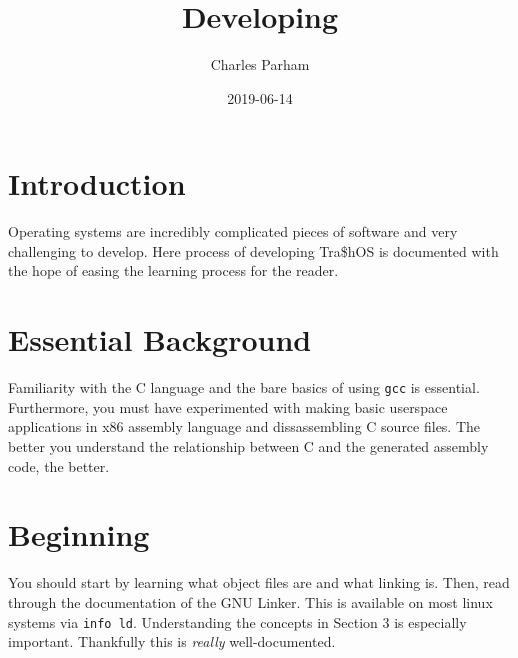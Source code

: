 \documentclass[twocolumn,11pt]{article}
\title{Developing \trashos}
\author{Charles Parham}
\date{2019-06-14}
\newcommand{\trashos}{Tra\$hOS }
\begin{document}
    \maketitle

    \section*{Introduction}

    Operating systems are incredibly complicated pieces of software and very
    challenging to develop. Here process of developing \trashos is documented
    with the hope of easing the learning process for the reader.

    \section{Essential Background}

    Familiarity with the C language and the bare basics of using \verb|gcc| is
    essential. Furthermore, you must have experimented with making basic
    userspace applications in x86 assembly language and dissassembling C source
    files. The better you understand the relationship between C and the
    generated assembly code, the better.

    \section{Beginning}

    You should start by learning what object files are and what linking is.
    Then, read through the documentation of the GNU Linker. This is available on
    most linux systems via \verb|info ld|. Understanding the concepts in Section
    3 is especially important. Thankfully this is {\it really} well-documented.
\end{document}
